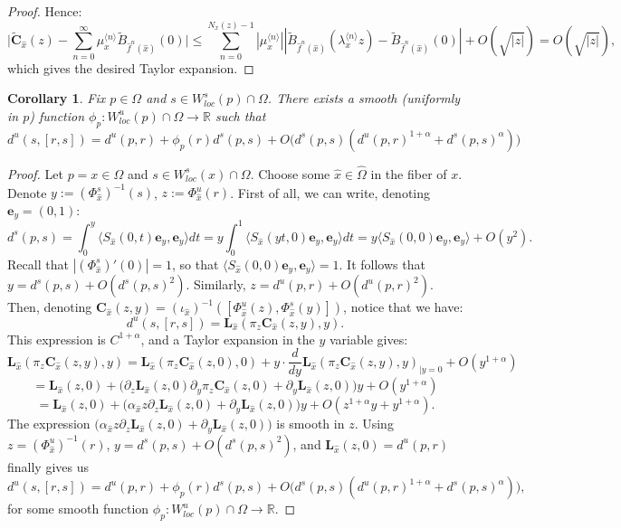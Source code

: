 \documentclass[a4paper]{article}
\newtheorem{corollary}[theorem]{Corollary}
\theoremstyle{definition}
\begin{document}
\begin{proof}
Hence:
$$ \Big| \widetilde{\mathbf{C}}_{\widehat{x}}(z) - \sum_{n=0}^\infty \mu_x^{\langle n \rangle} \widetilde{B}_{\widehat{f}^n({\widehat{x}})}(0) \Big| \leq \sum_{n=0}^{N_x(z)-1} |\mu_x^{\langle n \rangle}| |\widetilde{B}_{\widehat{f}^n({\widehat{x}})}(\lambda_x^{\langle n \rangle} z) - \widetilde{B}_{\widehat{f}^n({\widehat{x}})}(0) | + O(\sqrt{|z|}) = O(\sqrt{|z|}), $$
which gives the desired Taylor expansion.
\end{proof}

\begin{corollary}
Fix $p \in \Omega$ and $s \in W^s_{loc}(p) \cap \Omega$. There exists a smooth (uniformly in $p$) function $\phi_{p}: W^u_{loc}(p) \cap \Omega \rightarrow \mathbb{R}$ such that
$$ d^u(s,[r,s]) = d^u(p,r) + \phi_{p}(r) d^s(p,s) + O\Big( 
d^s(p,s)(d^u(p,r)^{1+\alpha} + d^s(p,s)^{\alpha}) \Big) $$
\end{corollary}

\begin{proof}

Let $p=x \in \Omega$ and $s \in W^s_{loc}(x) \cap \Omega$. Choose some ${\widehat{x}} \in \widehat{\Omega}$ in the fiber of $x$. Denote $y := (\Phi_{\widehat{x}}^s)^{-1}(s)$, $z := \Phi_{\widehat{x}}^u(r)$.
 First of all, we can write, denoting $\mathbf{e}_y = (0,1)$:
$$ d^s(p,s) = \int_0^y \langle S_{\widehat{x}}(0,t) \mathbf{e}_y, \mathbf{e}_y \rangle dt = y \int_0^1  \langle S_{\widehat{x}}(y t,0) \mathbf{e}_y, \mathbf{e}_y \rangle dt = y \langle S_{\widehat{x}}(0,0) \mathbf{e}_y, \mathbf{e}_y \rangle + O(y^2). $$
Recall that $|(\Phi_{\widehat{x}}^s)'(0)| = 1$, so that $\langle S_{\widehat{x}}(0,0) \mathbf{e}_y, \mathbf{e}_y \rangle=1$.
It follows that $y = d^s(p,s) + O(d^s(p,s)^2)$. Similarly, $z = d^u(p,r) + O(d^u(p,r)^2)$. Then, denoting $\mathbf{C}_{\widehat{x}}(z,y) = (\iota_{\widehat{x}})^{-1}( [ \Phi_{\widehat{x}}^u(z), \Phi_{\widehat{x}}^s(y) ] )$, notice that we have:
$$ d^u(s,[r,s]) = \mathbf{L}_{\widehat{x}}(\pi_z \mathbf{C}_{\widehat{x}}(z,y),y).$$
This expression is $C^{1+\alpha}$, and a Taylor expansion in the $y$ variable gives:
$$ \mathbf{L}_{\widehat{x}}(\pi_z \mathbf{C}_{\widehat{x}}(z,y),y) = \mathbf{L}_{\widehat{x}}(\pi_z \mathbf{C}_{\widehat{x}}(z,0),0) + y \cdot \frac{d}{dy}  \mathbf{L}_{\widehat{x}}( \pi_z \mathbf{C}_{\widehat{x}}(z,y),y)_{|y=0} + O(y^{1+\alpha})  $$
$$ =  \mathbf{L}_{\widehat{x}}(z,0) + \big(\partial_z \mathbf{L}_{\widehat{x}}(z,0) \partial_y \pi_z \mathbf{C}_{\widehat{x}}(z,0) + \partial_y \mathbf{L}_{\widehat{x}}(z,0)\big)y + O(y^{1+\alpha})  $$
$$ = \mathbf{L}_{\widehat{x}}(z,0) + \big( \alpha_{\widehat{x}} z \partial_z \mathbf{L}_{\widehat{x}}(z,0) + \partial_y \mathbf{L}_{\widehat{x}}(z,0)\big)y + O( 
z^{1+\alpha} y + y^{1+\alpha}). $$
The expression $\big( \alpha_{\widehat{x}} z \partial_z \mathbf{L}_{\widehat{x}}(z,0) + \partial_y \mathbf{L}_{\widehat{x}}(z,0)\big)$ is smooth in $z$. Using $z=(\Phi_{\widehat{x}}^u)^{-1}(r)$, $y = d^s(p,s) + O(d^s(p,s)^2)$, and $\mathbf{L}_{\widehat{x}}(z,0) = d^u(p,r)$ finally gives us
$$ d^u(s,[r,s]) = d^u(p,r) + \phi_{p}(r) d^s(p,s) + O\Big( 
d^s(p,s)(d^u(p,r)^{1+\alpha} + d^s(p,s)^{\alpha}) \Big) ,$$
for some smooth function $\phi_p : W^u_{loc}(p) \cap \Omega \rightarrow \mathbb{R}$.
\end{proof}
\end{document}
